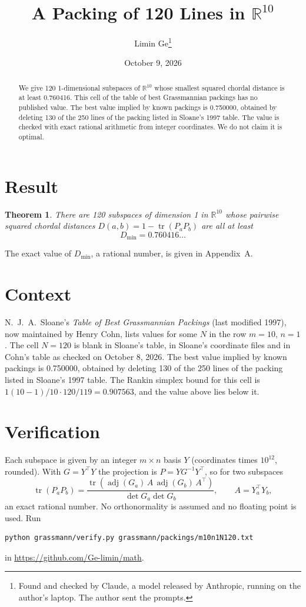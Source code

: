 \documentclass[11pt,a4paper]{article}
\title{A Packing of 120 Lines in $\mathbb{R}^{10}$}
\author{Limin Ge\thanks{Found and checked by Claude, a model released by Anthropic, running on the author's laptop. The author sent the prompts.}}
\date{October 9, 2026}
\newtheorem*{theorem}{Theorem}
\begin{document}
\maketitle
\begin{abstract}
We give 120 1-dimensional subspaces of $\mathbb{R}^{10}$ whose smallest squared chordal distance is at least 0.760416. This cell of the table of best Grassmannian packings has no published value. The best value implied by known packings is 0.750000, obtained by deleting 130 of the 250 lines of the packing listed in Sloane's 1997 table. The value is checked with exact rational arithmetic from integer coordinates. We do not claim it is optimal.
\end{abstract}

\section{Result}
\begin{theorem}
There are 120 subspaces of dimension 1 in $\mathbb{R}^{10}$ whose pairwise squared chordal distances $D(a,b) = 1 - \operatorname{tr}(P_aP_b)$ are all at least
\[ D_{\min} = 0.760416\ldots \]
\end{theorem}
The exact value of $D_{\min}$, a rational number, is given in Appendix~A.


\section{Context}
N.~J.~A.~Sloane's \emph{Table of Best Grassmannian Packings} (last modified 1997), now maintained by Henry Cohn, lists values for some $N$ in the row $m=10$, $n=1$. The cell $N=120$ is blank in Sloane's table, in Sloane's coordinate files and in Cohn's table as checked on October 8, 2026. The best value implied by known packings is 0.750000, obtained by deleting 130 of the 250 lines of the packing listed in Sloane's 1997 table. The Rankin simplex bound for this cell is $1(10-1)/10\cdot 120/119 = 0.907563$, and the value above lies below it.


\section{Verification}
Each subspace is given by an integer $m\times n$ basis $Y$ (coordinates times $10^{12}$, rounded). With $G=Y^\top Y$ the projection is $P=YG^{-1}Y^\top$, so for two subspaces
\[ \operatorname{tr}(P_aP_b)=\frac{\operatorname{tr}(\operatorname{adj}(G_a)\,A\,\operatorname{adj}(G_b)\,A^\top)}{\det G_a\det G_b},\qquad A=Y_a^\top Y_b, \]
an exact rational number. No orthonormality is assumed and no floating point is used. Run
\begin{verbatim}
python grassmann/verify.py grassmann/packings/m10n1N120.txt
\end{verbatim}
in \url{https://github.com/Ge-limin/math}.
\end{document}
